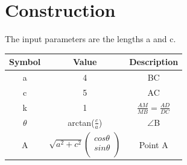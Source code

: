 \documentclass[journal,10pt,twocolumn]{article}
\begin{document}
\section*{Construction}
The input parameters are the lengths a and c.\\
{
\setlength\extrarowheight{2pt}
\begin{tabular}{|c|c|c|}
	\hline
	\textbf{Symbol}&\textbf{Value}&\textbf{Description}\\
	\hline
	a&4&BC\\
	\hline
	c&5&AC\\
	\hline
	k&1&$\frac{AM}{MB} = \frac{AD}{DC}$\\
	\hline
	$\theta$&arctan($\frac{c}{a}$)&$\angle$B\\
	\hline
	A&$\sqrt{a^2+c^2}%
	\begin{pmatrix}
		cos\theta\\
		sin\theta\\
	\end{pmatrix}$%
	&Point A\\
	\hline
\end{tabular}
}
\end{document}
